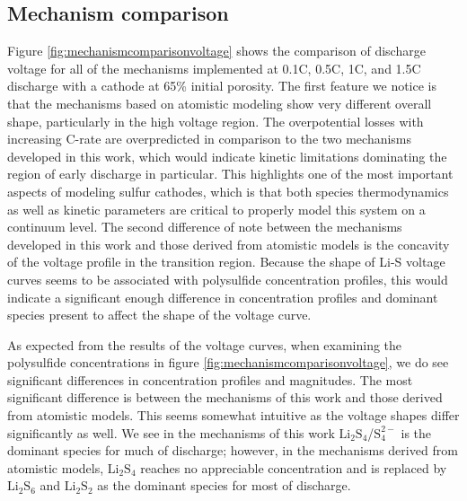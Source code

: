 \documentclass{elsarticle}
\begin{document}
\subsection{Mechanism comparison}
Figure \ref{fig:mechanismcomparisonvoltage} shows the comparison of discharge voltage for all of the mechanisms implemented at 0.1C, 0.5C, 1C, and 1.5C discharge with a cathode at 65\% initial porosity. The first feature we notice is that the mechanisms based on atomistic modeling show very different overall shape, particularly in the high voltage region. The overpotential losses with increasing C-rate are overpredicted in comparison to the two mechanisms developed in this work, which would indicate kinetic limitations dominating the region of early discharge in particular. This highlights one of the most important aspects of modeling sulfur cathodes, which is that both species thermodynamics as well as kinetic parameters are critical to properly model this system on a continuum level. The second difference of note between the mechanisms developed in this work and those derived from atomistic models is the concavity of the voltage profile in the transition region. Because the shape of Li-S voltage curves seems to be associated with polysulfide concentration profiles, this would indicate a significant enough difference in concentration profiles and dominant species present to affect the shape of the voltage curve. 

As expected from the results of the voltage curves, when examining the polysulfide concentrations in figure \ref{fig:mechanismcomparisonvoltage}, we do see significant differences in concentration profiles and magnitudes. The most significant difference is between the mechanisms of this work and those derived from atomistic models. This seems somewhat intuitive as the voltage shapes differ significantly as well. We see in the mechanisms of this work $\mathrm{Li}_2\mathrm{S}_4$/$\mathrm{S}^{2-}_4$ is the dominant species for much of discharge; however, in the mechanisms derived from atomistic models, $\mathrm{Li}_2\mathrm{S}_4$ reaches no appreciable concentration and is replaced by $\mathrm{Li}_2\mathrm{S}_6$ and $\mathrm{Li}_2\mathrm{S}_2$ as the dominant species for most of discharge. 
\end{document}
